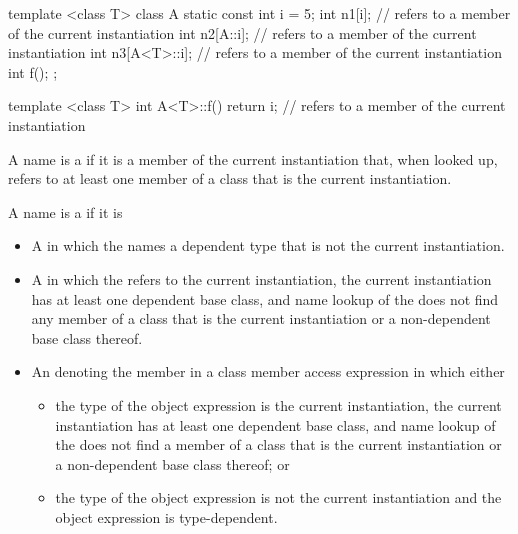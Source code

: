 \begin{example}
\begin{codeblock}
template <class T> class A {
  static const int i = 5;
  int n1[i];                    //  refers to a member of the current instantiation
  int n2[A::i];                 //  refers to a member of the current instantiation
  int n3[A<T>::i];              //  refers to a member of the current instantiation
  int f();
};

template <class T> int A<T>::f() {
  return i;                     //  refers to a member of the current instantiation
}
\end{codeblock}
\end{example}

%
A name is a  if it is a
member of the current instantiation that, when looked up, refers to at least
one member of a class that is the current instantiation.

\pnum
A name is a
if it is

\begin{itemize}
\item
A
in which the
names a dependent type that is not the current instantiation.

\item A  in which the 
refers to the current instantiation, the current instantiation has at least one
dependent base class, and name lookup of the  does not
find any member of a class that is the current instantiation or a non-dependent
base class thereof.

\item An  denoting the member in a class member access
expression in which either
\begin{itemize}
\item the type of the object expression is the current instantiation, the
current instantiation has at least one dependent base class, and name lookup
of the  does not find a member of a class that is
the current instantiation or a non-dependent base class thereof; or

\item the type of the object expression is not the current instantiation
and the object expression is type-dependent.
\end{itemize}
\end{itemize}

